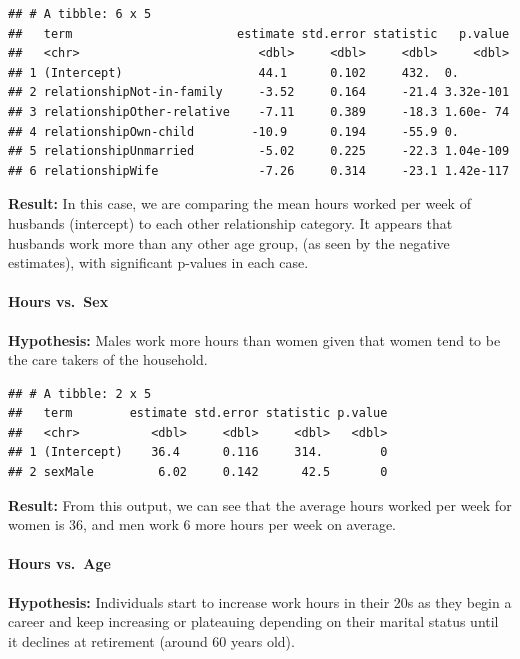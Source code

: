 \documentclass[]{article}
\let\oldparagraph\paragraph
\renewcommand{\paragraph}[1]{\oldparagraph{#1}\mbox{}}
\begin{document}
\begin{verbatim}
## # A tibble: 6 x 5
##   term                       estimate std.error statistic   p.value
##   <chr>                         <dbl>     <dbl>     <dbl>     <dbl>
## 1 (Intercept)                   44.1      0.102     432.  0.       
## 2 relationshipNot-in-family     -3.52     0.164     -21.4 3.32e-101
## 3 relationshipOther-relative    -7.11     0.389     -18.3 1.60e- 74
## 4 relationshipOwn-child        -10.9      0.194     -55.9 0.       
## 5 relationshipUnmarried         -5.02     0.225     -22.3 1.04e-109
## 6 relationshipWife              -7.26     0.314     -23.1 1.42e-117
\end{verbatim}

\textbf{Result:} In this case, we are comparing the mean hours worked
per week of husbands (intercept) to each other relationship category. It
appears that husbands work more than any other age group, (as seen by
the negative estimates), with significant p-values in each case.

\hypertarget{hours-vs.-sex}{%
\paragraph{Hours vs.~Sex}\label{hours-vs.-sex}}

\textbf{Hypothesis:} Males work more hours than women given that women
tend to be the care takers of the household.

\begin{verbatim}
## # A tibble: 2 x 5
##   term        estimate std.error statistic p.value
##   <chr>          <dbl>     <dbl>     <dbl>   <dbl>
## 1 (Intercept)    36.4      0.116     314.        0
## 2 sexMale         6.02     0.142      42.5       0
\end{verbatim}

\textbf{Result:} From this output, we can see that the average hours
worked per week for women is 36, and men work 6 more hours per week on
average.

\hypertarget{hours-vs.-age}{%
\paragraph{Hours vs.~Age}\label{hours-vs.-age}}

\textbf{Hypothesis:} Individuals start to increase work hours in their
20s as they begin a career and keep increasing or plateauing depending
on their marital status until it declines at retirement (around 60 years
old).
\end{document}
